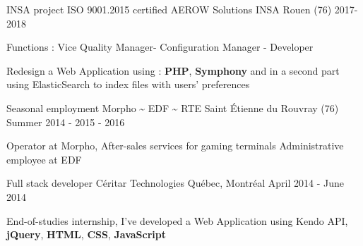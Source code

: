 

\begin{cventries}

  \cventry
	{INSA project ISO 9001.2015 certified} %
	{AEROW Solutions} %
	{INSA Rouen (76)} %
	{2017-2018} %
	{
		\begin{cvitems} %
			\item {Functions : Vice Quality Manager- Configuration Manager  - Developer}
			\item {Redesign a Web Application using : \textbf{PHP}, \textbf{Symphony} and in a second part using ElasticSearch to   index files with users' preferences}
		\end{cvitems}
	}
	
	
	\cventry
	{Seasonal employment} %
	{Morpho \textasciitilde{} EDF \textasciitilde{} RTE} %
	{Saint Étienne du Rouvray (76)} %
	{Summer 2014 - 2015 - 2016} %
	{
		\begin{cvitems} %
			\item {Operator at Morpho, After-sales services for gaming terminals \textbf{{\enskip\cdotp\enskip}} Administrative employee at EDF}
		\end{cvitems}
	}


  \cventry
    {Full stack developer} %
    {Céritar Technologies} %
    {Québec, Montréal} %
    {April 2014 - June 2014} %
    {
      \begin{cvitems} %
        \item {End-of-studies internship, I've developed a Web Application using Kendo API, \textbf{jQuery}, \textbf{HTML}, \textbf{CSS}, \textbf{JavaScript}}
      \end{cvitems}
    }

\end{cventries}
